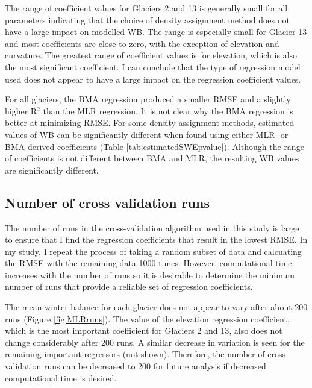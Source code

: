 \documentclass{sfuthesis}
\begin{document}
The range of coefficient values for Glaciers 2 and 13 is generally small for all parameters indicating that the choice of density assignment method does not have a large impact on modelled WB. The range is especially small for Glacier 13 and most coefficients are close to zero, with the exception of elevation and curvature. The greatest range of coefficient values is for elevation, which is also the most significant coefficient. I can conclude that the type of regression model used does not appear to have a large impact on the regression coefficient values.

For all glaciers, the BMA regression produced a smaller RMSE and a slightly higher R$^2$ than the MLR regression. It is not clear why the BMA regression is better at minimizing RMSE. For some density assignment methods, estimated values of WB can be significantly different when found using either MLR- or BMA-derived coefficients (Table \ref{tab:estimatedSWEpvalue}). Although the range of coefficients is not different between BMA and MLR, the resulting WB values are significantly different. 

\subsection{Number of cross validation runs}

The number of runs in the cross-validation algorithm used in this study is large to ensure that I find the regression coefficients that result in the lowest RMSE. In my study, I repeat the process of taking a random subset of data and calcuating the RMSE with the remaining data 1000 times.  However, computational time increases with the number of runs so it is desirable to determine the minimum number of runs that provide a reliable set of regression coefficients. 

The mean winter balance for each glacier does not appear to vary after about 200 runs (Figure \ref{fig:MLRruns}). The value of the elevation regression coefficient, which is the most important coefficient for Glaciers 2 and 13, also does not change considerably after 200 runs. A similar decrease in variation is seen for the remaining important regressors (not shown). Therefore, the number of cross validation runs can be decreased to 200 for future analysis if decreased computational time is desired. 
\end{document}
